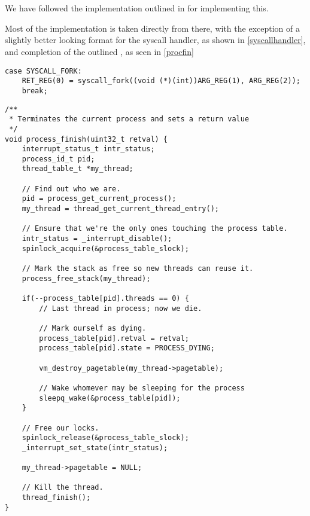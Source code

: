 \section{}

We have followed the implementation outlined in  for
implementing this.

Most of the implementation is taken directly from there, with the exception
of a slightly better looking format for the syscall handler, as shown in
\autoref{syscallhandler}, and completion of the outlined ,
as seen in \autoref{procfin}

\begin{lstlisting}
case SYSCALL_FORK:
    RET_REG(0) = syscall_fork((void (*)(int))ARG_REG(1), ARG_REG(2));
    break;
\end{lstlisting}
\begin{lstlisting}
/**
 * Terminates the current process and sets a return value
 */
void process_finish(uint32_t retval) {
    interrupt_status_t intr_status;
    process_id_t pid;
    thread_table_t *my_thread;

    // Find out who we are.
    pid = process_get_current_process();
    my_thread = thread_get_current_thread_entry();

    // Ensure that we're the only ones touching the process table.
    intr_status = _interrupt_disable();
    spinlock_acquire(&process_table_slock);

    // Mark the stack as free so new threads can reuse it.
    process_free_stack(my_thread);

    if(--process_table[pid].threads == 0) {
        // Last thread in process; now we die.

        // Mark ourself as dying.
        process_table[pid].retval = retval;
        process_table[pid].state = PROCESS_DYING;

        vm_destroy_pagetable(my_thread->pagetable);

        // Wake whomever may be sleeping for the process
        sleepq_wake(&process_table[pid]);
    }

    // Free our locks.
    spinlock_release(&process_table_slock);
    _interrupt_set_state(intr_status);

    my_thread->pagetable = NULL;

    // Kill the thread.
    thread_finish();
}
\end{lstlisting}
